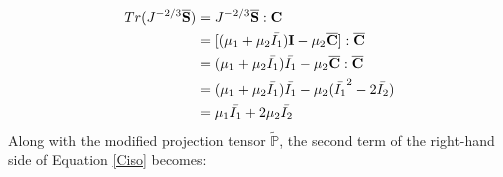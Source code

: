 \begin{equation}
\begin{split}
Tr(J^{-2/3}\overline{\bold{S}}) &= J^{-2/3}{\overline{\bold{S}}} : {\bold{C}} \\
&= [(\mu_1 + \mu_2{\bar{I_1}})\bold{I} - \mu_2{\overline{\bold{C}}}] : \overline{\bold{C}} \\
&= (\mu_1 + \mu_2\bar{I_1})\bar{I_1} - \mu_2{\overline{\bold{C}}} : {\overline{\bold{C}}} \\
&= (\mu_1 + \mu_2\bar{I_1})\bar{I_1} - \mu_2({\bar{I_1}}^2 - 2\bar{I_2}) \\
&= \mu_1\bar{I_1} + 2\mu_2\bar{I_2}
\end{split}
\end{equation}
Along with the modified projection tensor $\tilde{\mathbb{P}}$, the second term of the right-hand side of Equation \ref{Ciso} becomes:

